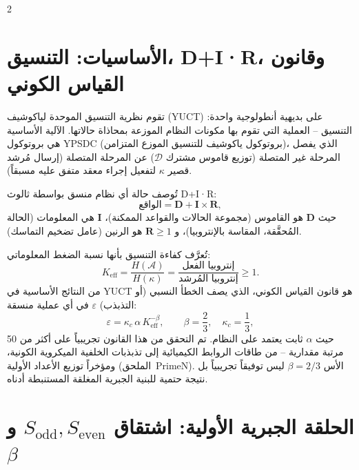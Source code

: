 \documentclass[12pt,a4paper]{article}
\newcommand{\Keff}{K_{\mathrm{eff}}}
\newcommand{\kappac}{\kappa_c}
\begin{document}
	\begin{multicols}{2}
		\raggedleft
		
		\section{الأساسيات: التنسيق، D+I·R، وقانون القياس الكوني}
		
		تقوم نظرية التنسيق الموحدة لياكوشيف (YUCT) على بديهية أنطولوجية واحدة: التنسيق – العملية التي تقوم بها مكونات النظام الموزعة بمحاذاة حالاتها. الآلية الأساسية هي بروتوكول YPSDC (بروتوكول ياكوشيف للتنسيق الموزع المتزامن)، الذي يفصل المرحلة غير المتصلة (توزيع قاموس مشترك \(\mathcal{D}\)) عن المرحلة المتصلة (إرسال مُرشد قصير \(\kappa\) لتفعيل إجراء معقد متفق عليه مسبقاً).
		
		تُوصف حالة أي نظام منسق بواسطة ثالوث D+I·R:
		\[
		\text{الواقع} = \mathbf{D} + \mathbf{I} \times \mathbf{R},
		\]
		حيث \(\mathbf{D}\) هو القاموس (مجموعة الحالات والقواعد الممكنة)، \(\mathbf{I}\) هي المعلومات (الحالة المُحقَّقة، المقاسة بالإنتروبيا)، و \(\mathbf{R} \ge 1\) هو الرنين (عامل تضخيم التماسك).
		
		تُعرَّف كفاءة التنسيق بأنها نسبة الضغط المعلوماتي:
		\[
		\Keff = \frac{H(\mathcal{A})}{H(\kappa)} = \frac{\text{إنتروبيا الفعل}}{\text{إنتروبيا المُرشد}} \ge 1.
		\]
		من النتائج الأساسية في YUCT هو قانون القياس الكوني، الذي يصف الخطأ النسبي (أو التذبذب) \(\varepsilon\) في أي عملية منسقة:
		\[
		\boxed{\varepsilon = \kappac \, \alpha \, \Keff^{-\beta}, \qquad \beta = \frac{2}{3}, \quad \kappac = \frac{1}{3}},
		\]
		حيث \(\alpha\) ثابت يعتمد على النظام. تم التحقق من هذا القانون تجريبياً على أكثر من 50 مرتبة مقدارية – من طاقات الروابط الكيميائية إلى تذبذبات الخلفية الميكروية الكونية، ومؤخراً توزيع الأعداد الأولية (الملحق~PrimeN). الأس \(\beta = 2/3\) ليس توفيقاً تجريبياً بل نتيجة حتمية للبنية الجبرية المغلقة المستنبطة أدناه.
		
		\section{الحلقة الجبرية الأولية: اشتقاق \(S_{\mathrm{odd}}, S_{\mathrm{even}}\) و \(\beta\)}
		

\end{multicols}
\end{document}
